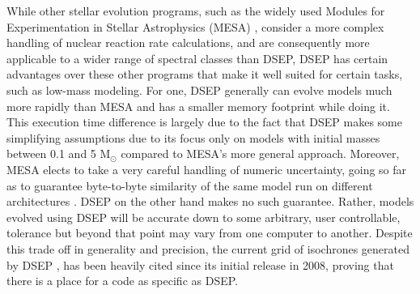 While other stellar evolution programs, such as the widely used Modules for
Experimentation in Stellar Astrophysics (MESA) \citep{Paxton2011}, consider a
more complex handling of nuclear reaction rate calculations, and are
consequently more applicable to a wider range of spectral classes than DSEP,
DSEP has certain advantages over these other programs that make it well suited
for certain tasks, such as low-mass modeling. For one, DSEP generally can
evolve models much more rapidly than MESA and has a smaller memory footprint
while doing it. This execution time difference is largely due to the fact that
DSEP makes some simplifying assumptions due to its focus only on models with
initial masses between 0.1 and 5 M$_{\odot}$ compared to MESA’s more general
approach.  Moreover, MESA elects to take a very careful handling of numeric
uncertainty, going so far as to guarantee byte-to-byte similarity of the same
model run on different architectures \citep{Paxton2011}. DSEP on the other hand
makes no such guarantee. Rather, models evolved using DSEP will be accurate
down to some arbitrary, user controllable, tolerance but beyond that point may
vary from one computer to another. Despite this trade off in generality and
precision, the current grid of isochrones generated by DSEP \citep{Dotter2008},
has been heavily cited since its initial release in 2008, proving that there is
a place for a code as specific as DSEP.
